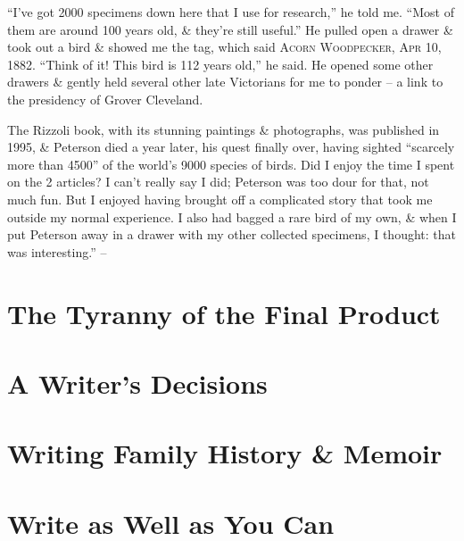 \documentclass{article}
\numberwithin{equation}{section}
\begin{document}
``I've got 2000 specimens down here that I use for research,'' he told me. ``Most of them are around 100 years old, \& they're still useful.'' He pulled open a drawer \& took out a bird \& showed me the tag, which said \textsc{Acorn Woodpecker, Apr 10, 1882}. ``Think of it! This bird is 112 years old,'' he said. He opened some other drawers \& gently held several other late Victorians for me to ponder -- a link to the presidency of Grover Cleveland.

The Rizzoli book, with its stunning paintings \& photographs, was published in 1995, \& Peterson died a year later, his quest finally over, having sighted ``scarcely more than 4500'' of the world's 9000 species of birds. Did I enjoy the time I spent on the 2 articles? I can't really say I did; Peterson was too dour for that, not much fun. But I enjoyed having brought off a complicated story that took me outside my normal experience. I also had bagged a rare bird of my own, \& when I put Peterson away in a drawer with my other collected specimens, I thought: that was interesting.'' -- \cite[pp. 227--236]{Zinsser2016}


\section{The Tyranny of the Final Product}


\section{A Writer's Decisions}


\section{Writing Family History \& Memoir}


\section{Write as Well as You Can}


\printbibliography[heading=bibintoc]
	
\end{document}
